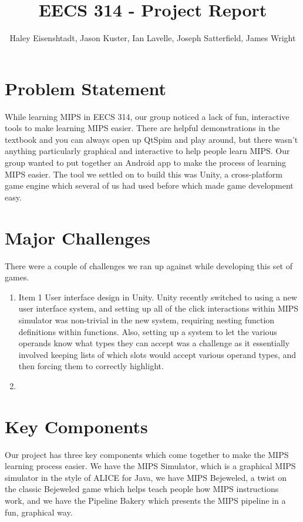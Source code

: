 \documentclass[12pt]{article}
\title{EECS 314 - Project Report}
\author{Haley Eisenshtadt, Jason Kuster, Ian Lavelle, Joseph Satterfield, James Wright}
\begin{document}
	\maketitle
	\section{Problem Statement}
	While learning MIPS in EECS 314, our group noticed a lack of fun, interactive tools to make learning MIPS easier. There are helpful demonstrations in the textbook and you can always open up QtSpim and play around, but there wasn't anything particularly graphical and interactive to help people learn MIPS. Our group wanted to put together an Android app to make the process of learning MIPS easier. The tool we settled on to build this was Unity, a cross-platform game engine which several of us had used before which made game development easy.
	\section{Major Challenges}
	There were a couple of challenges we ran up against while developing this set of games.
	\begin{enumerate}
		\item Item 1 User interface design in Unity. Unity recently switched to using a new user interface system, and setting up all of the click interactions within MIPS simulator was non-trivial in the new system, requiring nesting function definitions within functions. Also, setting up a system to let the various operands know what types they can accept was a challenge as it essentially involved keeping lists of which slots would accept various operand types, and then forcing them to correctly highlight.
		\item 
	\end{enumerate}
	\section{Key Components}
	Our project has three key components which come together to make the MIPS learning process easier. We have the MIPS Simulator, which is a graphical MIPS simulator in the style of ALICE for Java, we have MIPS Bejeweled, a twist on the classic Bejeweled game which helps teach people how MIPS instructions work, and we have the Pipeline Bakery which presents the MIPS pipeline in a fun, graphical way.
\end{document}
